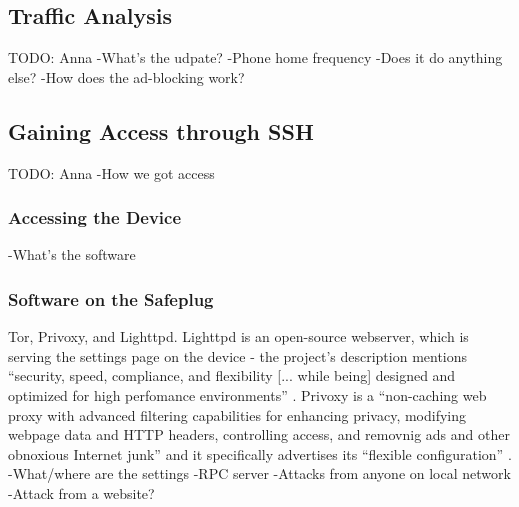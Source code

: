 \subsection{Traffic Analysis}
\label{sec:traffic}
TODO: Anna
    -What's the udpate?
    -Phone home frequency
    -Does it do anything else?
    -How does the ad-blocking work?

\subsection{Gaining Access through SSH}
\label{sec:SSH}
TODO: Anna
    -How we got access
    \subsubsection{Accessing the Device}
    -What's the software
    \subsubsection{Software on the Safeplug}
Tor, Privoxy, and Lighttpd.  Lighttpd is an open-source webserver, which is serving the settings page on the device - the project's description mentions ``security, speed, compliance, and flexibility [... while being] designed and optimized for high perfomance environments'' \cite{lighttpd}.  Privoxy is a ``non-caching web proxy with advanced filtering capabilities for enhancing privacy, modifying webpage data and HTTP headers, controlling access, and removnig ads and other obnoxious Internet junk'' and it specifically advertises its ``flexible configuration'' \cite{privoxy}.
    -What/where are the settings
    -RPC server
        -Attacks from anyone on local network
        -Attack from a website?
